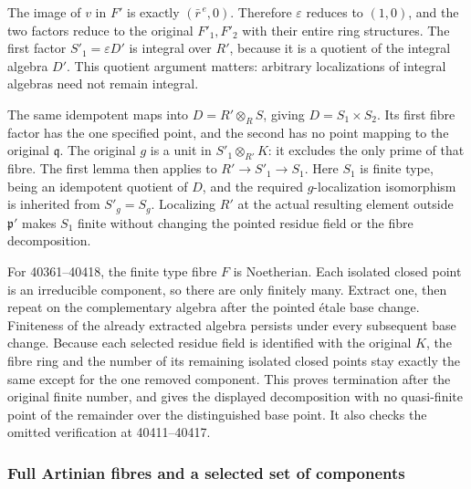 The image of \(v\) in \(F'\) is exactly \((\bar r^{\,e},0)\). Therefore \(\varepsilon\) reduces to \((1,0)\), and the two factors reduce to the original \(F'_1,F'_2\) with their entire ring structures. The first factor \(S'_1=\varepsilon D'\) is integral over \(R'\), because it is a quotient of the integral algebra \(D'\). This quotient argument matters: arbitrary localizations of integral algebras need not remain integral.

The same idempotent maps into \(D=R'\otimes_R S\), giving \(D=S_1\times S_2\). Its first fibre factor has the one specified point, and the second has no point mapping to the original \(\mathfrak q\). The original \(g\) is a unit in \(S'_1\otimes_{R'}K\): it excludes the only prime of that fibre. The first lemma then applies to \(R'\to S'_1\to S_1\). Here \(S_1\) is finite type, being an idempotent quotient of \(D\), and the required \(g\)-localization isomorphism is inherited from \(S'_g=S_g\). Localizing \(R'\) at the actual resulting element outside \(\mathfrak p'\) makes \(S_1\) finite without changing the pointed residue field or the fibre decomposition.

For 40361--40418, the finite type fibre \(F\) is Noetherian. Each isolated closed point is an irreducible component, so there are only finitely many. Extract one, then repeat on the complementary algebra after the pointed étale base change. Finiteness of the already extracted algebra persists under every subsequent base change. Because each selected residue field is identified with the original \(K\), the fibre ring and the number of its remaining isolated closed points stay exactly the same except for the one removed component. This proves termination after the original finite number, and gives the displayed decomposition with no quasi-finite point of the remainder over the distinguished base point. It also checks the omitted verification at 40411--40417.

\subsubsection{Full Artinian fibres and a selected set of components}\label{algebra-proof-053-full-artinian-fibres-and-a-selected-set-of-components}

